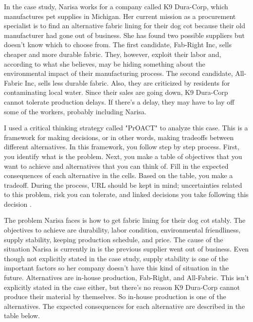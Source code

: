 \documentclass[paper=a4,12pt]{article}
\begin{document}
In the case study, Narisa works for a company called K9 Dura-Corp, which manufactures pet supplies in Michigan. Her current mission as a procurement specialist is to find an alternative fabric lining for their dog cot because their old manufacturer had gone out of business. She has found two possible suppliers but doesn't know which to choose from. The first candidate, Fab-Right Inc, sells cheaper and more durable fabric. They, however, exploit their labor and, according to what she believes, may be hiding something about the environmental impact of their manufacturing process. The second candidate, All-Fabric Inc, sells less durable fabric. Also, they are criticized by residents for contaminating local water. Since their sales are going down, K9 Dura-Corp cannot tolerate production delays. If there's a delay, they may have to lay off some of the workers, probably including Narisa.

I used a critical thinking strategy called "PrOACT" to analyze this case. This is a framework for making decisions, or in other words, making tradeoffs between different alternatives. In this framework, you follow step by step process. First, you identify what is the problem. Next, you make a table of objectives that you want to achieve and alternatives that you can think of. Fill in the expected consequences of each alternative in the cells. Based on the table, you make a tradeoff. During the process, URL should be kept in mind; uncertainties related to this problem, risk you can tolerate, and linked decisions you take following this decision \parencite{PrOACT}. 

The problem Narisa faces is how to get fabric lining for their dog cot stably. The objectives to achieve are durability, labor condition, environmental friendliness, supply stability, keeping production schedule, and price. The cause of the situation Narisa is currently in is the previous supplier went out of business. Even though not explicitly stated in the case study, supply stability is one of the important factors so her company doesn't have this kind of situation in the future. Alternatives are in-house production, Fab-Right, and All-Fabric. This isn't explicitly stated in the case either, but there's no reason K9 Dura-Corp cannot produce their material by themselves. So in-house production is one of the alternatives. The expected consequences for each alternative are described in the table below.
\end{document}
